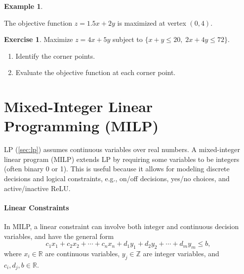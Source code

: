 \documentclass[oneside,11pt,dvipsnames]{book}
\numberwithin{equation}{section}
\theoremstyle{definition}
\newtheorem{example}{Example}[section]
\newtheorem{exercise}{Exercise}[section]
\theoremstyle{remark}
\begin{document}
\begin{example}
\begin{center}
\end{center}

The objective function $z = 1.5x+2y$ is maximized at vertex $(0,4)$.

\end{example}

\begin{exercise}\label{ex:lp-exercise2}
    Maximize $z=4x+5y$ subject to $\{x+y \le 20, \; 2x+4y \leq 72\}$.

    \begin{enumerate}    
        \item Identify the corner points.
        \item Evaluate the objective function at each corner point.
    \end{enumerate}
\end{exercise}




\section{Mixed-Integer Linear Programming (MILP)}\label{sec:milp}

LP (\autoref{sec:lp}) assumes continuous variables over real numbers.  
A mixed-integer linear program (MILP) extends LP by requiring some variables to be integers (often binary 0 or 1).  This is useful because it allows for modeling discrete decisions and logical constraints, e.g., on/off decisions, yes/no choices, and active/inactive ReLU.

\paragraph{Linear Constraints}
In MILP, a linear constraint can involve both integer and continuous decision variables, and have the general form
\[
c_1x_1 + c_2x_2 + \cdots + c_nx_n + d_1y_1 + d_2y_2 + \cdots + d_my_m \leq b,
\]
where $x_i \in \mathbb{R}$ are continuous variables, $y_j \in \mathbb{Z}$ are integer variables, and $c_i, d_j, b \in \mathbb{R}$.
\end{document}
